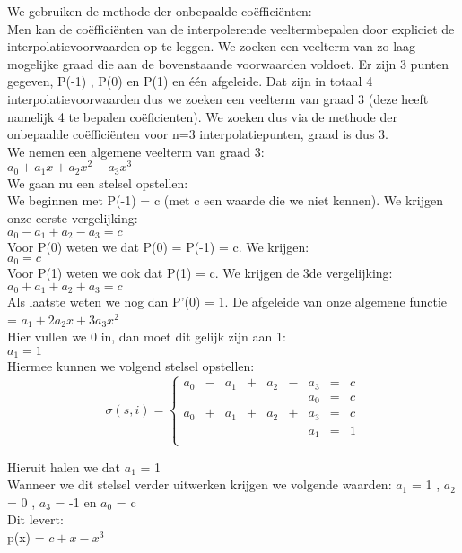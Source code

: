 We gebruiken de methode der onbepaalde co\"effici\"enten: \\
Men kan de co\"effici\"enten van de interpolerende veeltermbepalen door expliciet de interpolatievoorwaarden op te leggen. We zoeken een veelterm van zo laag mogelijke graad die aan de bovenstaande voorwaarden voldoet.   Er zijn 3 punten gegeven, P(-1) , P(0) en P(1) en \'e\'en afgeleide. Dat zijn in totaal 4 interpolatievoorwaarden dus we zoeken een veelterm van graad 3 (deze heeft namelijk 4 te bepalen co\"eficienten). We zoeken dus via de methode der onbepaalde co\"effici\"enten voor n=3 interpolatiepunten, graad is dus 3.\\
We nemen een algemene veelterm van graad 3: \\
\indent $ a_0 + a_1x + a_2x^2 + a_3x^3 $ \\
We gaan nu een stelsel opstellen: \\
We beginnen met P(-1) = c (met c een waarde die we niet kennen). We krijgen onze eerste vergelijking:\\
\indent $ a_0 - a_1 + a_2 - a_3 = c$ \\
Voor P(0) weten we dat P(0) = P(-1) = c. We krijgen: \\
\indent $ a_0 = c $ \\
Voor P(1) weten we ook dat P(1) = c. We krijgen de 3de vergelijking: \\
\indent $ a_0 + a_1 + a_2 + a_3 = c $ \\
Als laatste weten we nog dan P'(0) = 1. De afgeleide van onze algemene functie = $ a_1 + 2a_2x + 3a_3x^2$ \\
Hier vullen we 0 in, dan moet dit gelijk zijn aan 1: \\
\indent $ a_1 = 1$ \\
Hiermee kunnen we volgend stelsel opstellen: \\

\[
\sigma(s,i) = \left\{
    \begin{array}{ccccccccc}
		a_0 & - & a_1 & + & a_2 & - & a_3 & = & c \\
							  &&&&&& a_0 & = & c \\
		a_0 & + & a_1 & + & a_2 & + & a_3 & = & c \\
		                      &&&&&& a_1 & = & 1 \\
    \end{array}
\right.
\]


Hieruit halen we dat $a_1$ = 1 \\
Wanneer we dit stelsel verder uitwerken krijgen we volgende waarden:
$a_1$ = 1 , $a_2$ = 0 , $a_3$ = -1  en $a_0$ = c\\
Dit levert: \\
p(x) = $c+x-x^3$

